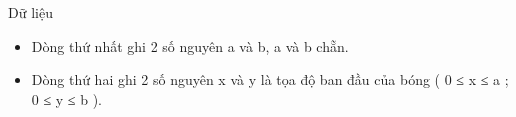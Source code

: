 Dữ liệu
\begin{itemize}
	\item     Dòng thứ nhất ghi 2 số nguyên a và b, a và b chẵn.   
	\item     Dòng thứ hai ghi 2 số nguyên x và y là tọa độ ban đầu của bóng ( 0 ≤ x ≤ a ; 0 ≤ y ≤ b ).   
\end{itemize}
